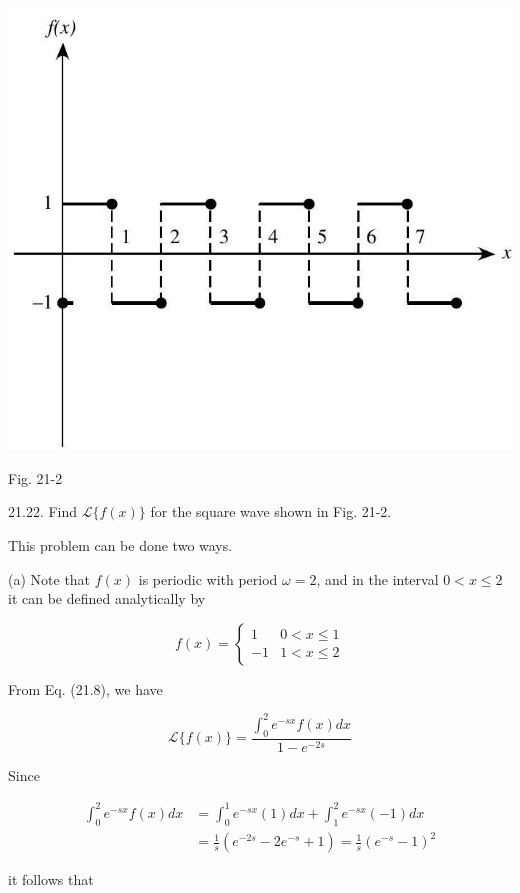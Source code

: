 \documentclass[10pt]{article}
\begin{document}
\begin{center}
\includegraphics[max width=\textwidth]{2024_04_03_5bb5b4275a64cb9887d1g-236}
\end{center}

Fig. 21-2

21.22. Find $\mathscr{L}\{f(x)\}$ for the square wave shown in Fig. 21-2.

This problem can be done two ways.

(a) Note that $f(x)$ is periodic with period $\omega=2$, and in the interval $0<x \leq 2$ it can be defined analytically by

$$
f(x)=\left\{\begin{array}{rr}
1 & 0<x \leq 1 \\
-1 & 1<x \leq 2
\end{array}\right.
$$

From Eq. (21.8), we have

$$
\mathscr{L}\{f(x)\}=\frac{\int_{0}^{2} e^{-s x} f(x) d x}{1-e^{-2 s}}
$$

Since

$$
\begin{aligned}
\int_{0}^{2} e^{-s x} f(x) d x & =\int_{0}^{1} e^{-s x}(1) d x+\int_{1}^{2} e^{-s x}(-1) d x \\
& =\frac{1}{s}\left(e^{-2 s}-2 e^{-s}+1\right)=\frac{1}{s}\left(e^{-s}-1\right)^{2}
\end{aligned}
$$

it follows that
\end{document}
